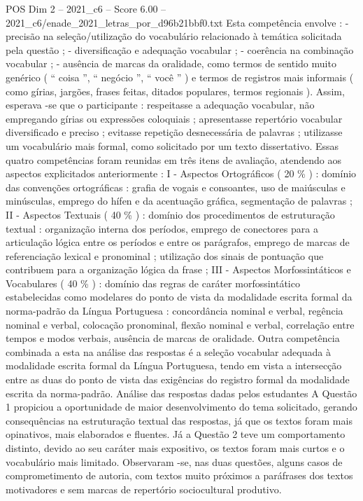 \begin{textsample}{POS Dim 2 – 2021\_c6 – Score 6.00 – 2021\_c6/enade\_2021\_letras\_por\_d96b21bbf0.txt}
Esta competência envolve : - precisão na seleção/utilização do vocabulário relacionado à temática solicitada pela questão ; - diversificação e adequação vocabular ; - coerência na combinação vocabular ; - ausência de marcas da oralidade, como termos de sentido muito genérico ( “ coisa ”, “ negócio ”, “ você ” ) e termos de registros mais informais ( como gírias, jargões, frases feitas, ditados populares, termos regionais ).
Assim, esperava -se que o participante : respeitasse a adequação vocabular, não empregando gírias ou expressões coloquiais ; apresentasse repertório vocabular diversificado e preciso ; evitasse repetição desnecessária de palavras ; utilizasse um vocabulário mais formal, como solicitado por um texto dissertativo.
Essas quatro competências foram reunidas em três itens de avaliação, atendendo aos aspectos explicitados anteriormente : I - Aspectos Ortográficos ( 20 \% ) : domínio das convenções ortográficas : grafia de vogais e consoantes, uso de maiúsculas e minúsculas, emprego do hífen e da acentuação gráfica, segmentação de palavras ; II - Aspectos Textuais ( 40 \% ) : domínio dos procedimentos de estruturação textual : organização interna dos períodos, emprego de conectores para a articulação lógica entre os períodos e entre os parágrafos, emprego de marcas de referenciação lexical e pronominal ; utilização dos sinais de pontuação que contribuem para a organização lógica da frase ; III - Aspectos Morfossintáticos e Vocabulares ( 40 \% ) : domínio das regras de caráter morfossintático estabelecidas como modelares do ponto de vista da modalidade escrita formal da norma-padrão da Língua Portuguesa : concordância nominal e verbal, regência nominal e verbal, colocação pronominal, flexão nominal e verbal, correlação entre tempos e modos verbais, ausência de marcas de oralidade.
Outra competência combinada a esta na análise das respostas é a seleção vocabular adequada à modalidade escrita formal da Língua Portuguesa, tendo em vista a intersecção entre as duas do ponto de vista das exigências do registro formal da modalidade escrita da norma-padrão.
Análise das respostas dadas pelos estudantes A Questão 1 propiciou a oportunidade de maior desenvolvimento do tema solicitado, gerando consequências na estruturação textual das respostas, já que os textos foram mais opinativos, mais elaborados e fluentes.
Já a Questão 2 teve um comportamento distinto, devido ao seu caráter mais expositivo, os textos foram mais curtos e o vocabulário mais limitado.
Observaram -se, nas duas questões, alguns casos de comprometimento de autoria, com textos muito próximos a paráfrases dos textos motivadores e sem marcas de repertório sociocultural produtivo.

\end{textsample}
